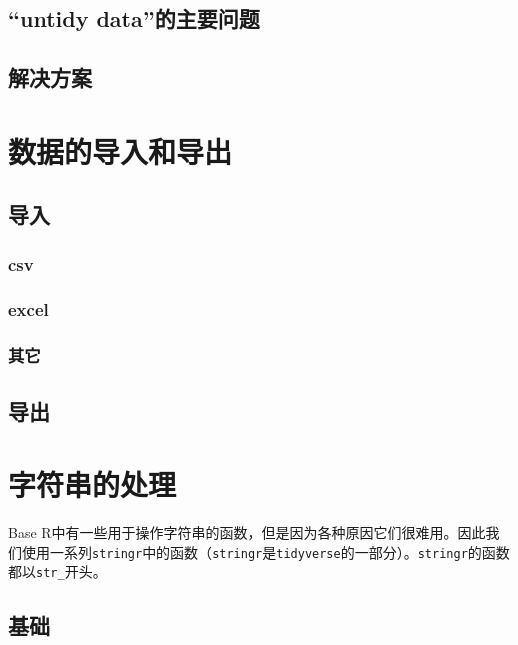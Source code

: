 \documentclass[]{book}
\begin{document}
\hypertarget{untidy-data}{%
\subsection{``untidy data''的主要问题}\label{untidy-data}}

\subsection{解决方案}

\hypertarget{import-export}{%
\section{数据的导入和导出}\label{import-export}}

\hypertarget{data-import}{%
\subsection{导入}\label{data-import}}

\hypertarget{csv}{%
\subsubsection{csv}\label{csv}}

\hypertarget{excel}{%
\subsubsection{excel}\label{excel}}

\subsubsection{其它}

\subsection{导出}

\hypertarget{strings}{%
\section{字符串的处理}\label{strings}}

Base R中有一些用于操作字符串的函数，但是因为各种原因它们很难用。因此我们使用一系列\texttt{stringr}中的函数（\texttt{stringr}是\texttt{tidyverse}的一部分）。\texttt{stringr}的函数都以\texttt{str\_}开头。

\subsection{基础}
\end{document}
